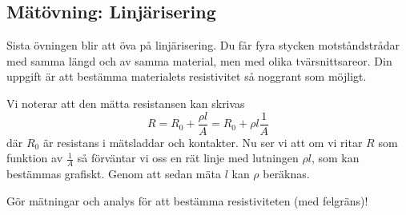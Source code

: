 \documentclass[a4paper,11pt]{article}
\begin{document}
\subsection*{Mätövning: Linjärisering}

Sista övningen blir att öva på linjärisering. Du får fyra stycken 
motståndstrådar med samma längd och av samma
material, men med olika tvärsnittsareor. Din uppgift är att bestämma materialets
resistivitet så noggrant som möjligt. 

Vi noterar att den mätta resistansen kan skrivas
\[
R = R_{0}+\frac{\rho l }{A} = R_{0} + \rho l \frac{1}{A}
\]
där $R_{0}$ är resistans i mätsladdar och kontakter. Nu ser vi att om 
vi ritar $R$  som funktion av $\frac{1}{A}$ så förväntar vi oss en 
rät linje med lutningen $\rho{}l$, som kan bestämmas grafiskt. Genom att sedan mäta
$l$ kan $\rho$ beräknas. 

Gör mätningar och analys för att bestämma resistiviteten (med 
felgräns)!



% 
% 
\end{document}

